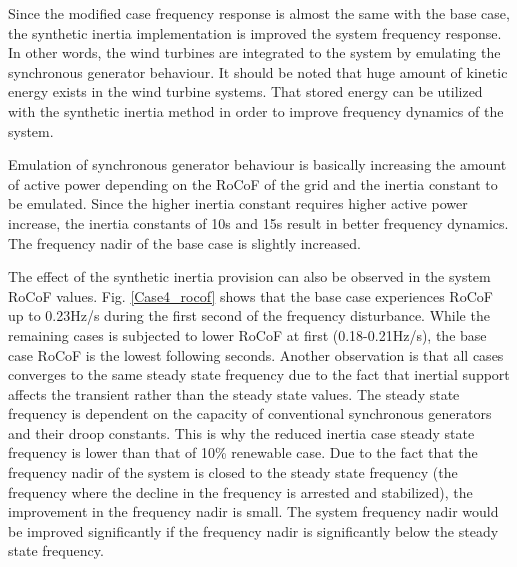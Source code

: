 Since the modified case frequency response is almost the same with the base case, the synthetic inertia implementation is improved the system frequency response. In other words, the wind turbines are integrated to the system by emulating the synchronous generator behaviour. It should be noted that huge amount of kinetic energy exists in the wind turbine systems. That stored energy can be utilized with the synthetic inertia method in order to improve frequency dynamics of the system. \par
Emulation of synchronous generator behaviour is basically increasing the amount of active power depending on the RoCoF of the grid and the inertia constant to be emulated. Since the higher inertia constant requires higher active power increase, the inertia constants of 10s and 15s result in better frequency dynamics. The frequency nadir of the base case is slightly increased. \par
The effect of the synthetic inertia provision can also be observed in the system RoCoF values. Fig. \ref{Case4_rocof} shows that the base case experiences RoCoF up to 0.23Hz/s during the first second of the frequency disturbance. While the remaining cases is subjected to lower RoCoF at first (0.18-0.21Hz/s), the base case RoCoF is the lowest following seconds. Another observation is that all cases converges to the same steady state frequency due to the fact that inertial support affects the transient rather than the steady state values. The steady state frequency is dependent on the capacity of conventional synchronous generators and their droop constants. This is why the reduced inertia case steady state frequency is lower than that of 10\% renewable case. Due to the fact that the frequency nadir of the system is closed to the steady state frequency (the frequency where the decline in the frequency is arrested and stabilized), the improvement in the frequency nadir is small. The system frequency nadir would be improved significantly if the frequency nadir is significantly below the steady state frequency. 
